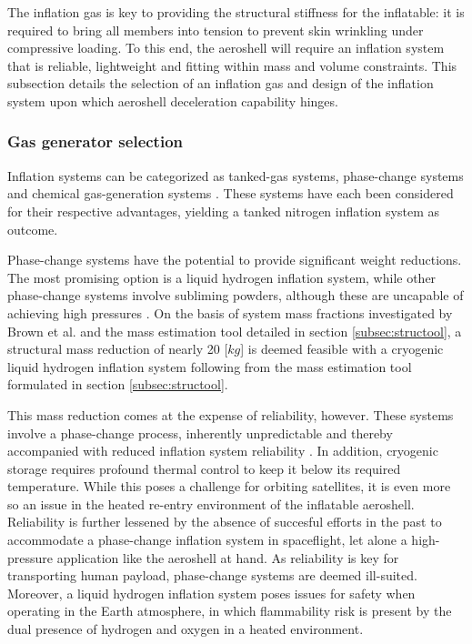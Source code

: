 The inflation gas is key to providing the structural stiffness for the inflatable: it is required to bring all members into tension to prevent skin wrinkling under compressive loading. To this end, the aeroshell will require an inflation system that is reliable, lightweight and fitting within mass and volume constraints. This subsection details the selection of an inflation gas and design of the inflation system upon which aeroshell deceleration capability hinges.

\subsubsection{Gas generator selection}
Inflation systems can be categorized as tanked-gas systems, phase-change systems and chemical gas-generation systems \cite{Jenkins2001}. These systems have each been considered for their respective advantages, yielding a tanked nitrogen inflation system as outcome. 

Phase-change systems have the potential to provide significant weight reductions. The most promising option is a liquid hydrogen inflation system, while other phase-change systems involve subliming powders, although these are uncapable of achieving high pressures \cite{Freeland1998}.  On the basis of system mass fractions investigated by Brown et al. \cite{Brown2009} and the mass estimation tool detailed in section \ref{subsec:structool}, a structural mass reduction of nearly 20 [$kg$] is deemed feasible with a cryogenic liquid hydrogen inflation system following from the mass estimation tool formulated in section \ref{subsec:structool}. 

This mass reduction comes at the expense of reliability, however. These systems involve a phase-change process, inherently unpredictable and thereby accompanied with reduced inflation system reliability \cite{Jenkins2001}. In addition, cryogenic storage requires profound thermal control to keep it below its required temperature. While this poses a challenge for orbiting satellites, it is even more so an issue in the heated re-entry environment of the inflatable aeroshell. Reliability is further lessened by the absence of succesful efforts in the past to accommodate a phase-change inflation system in spaceflight, let alone a high-pressure application like the aeroshell at hand. As reliability is key for transporting human payload, phase-change systems are deemed ill-suited. Moreover, a liquid hydrogen inflation system poses issues for safety when operating in the Earth atmosphere, in which flammability risk is present by the dual presence of hydrogen and oxygen in a heated environment.

